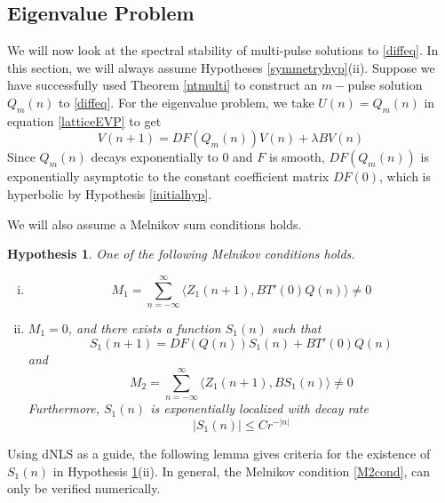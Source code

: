 \documentclass[12pt]{article}
\newtheorem{hypothesis}{Hypothesis}
\begin{document}
\subsection{Eigenvalue Problem}

We will now look at the spectral stability of multi-pulse solutions to \eqref{diffeq}. In this section, we will always assume Hypotheses \ref{symmetryhyp}(ii). Suppose we have successfully used Theorem \ref{ntmulti} to construct an $m-$pulse solution $Q_m(n)$ to \eqref{diffeq}. For the eigenvalue problem, we take $U(n) = Q_m(n)$ in equation \eqref{latticeEVP} to get
\begin{equation}\label{multiEVP}
V(n+1) = DF(Q_m(n)) V(n) + \lambda B V(n)
\end{equation}
Since $Q_m(n)$ decays exponentially to 0 and $F$ is smooth, $DF(Q_m(n))$ is exponentially asymptotic to the constant coefficient matrix $DF(0)$, which is hyperbolic by Hypothesis \ref{initialhyp}. 

We will also assume a Melnikov sum conditions holds.
\begin{hypothesis}\label{melnikovhyp}
One of the following Melnikov conditions holds.
\begin{enumerate}[(i)]
\item
\begin{equation}\label{M1cond}
M_1 = \sum_{n=-\infty}^\infty \langle Z_1(n+1), B T'(0)Q(n) \rangle \neq 0
\end{equation}
\item $M_1 = 0$, and there exists a function $S_1(n)$ such that
\begin{equation}\label{S1def}
S_1(n+1) = DF(Q(n)) S_1(n) + B T'(0)Q(n)
\end{equation}
and 
\begin{equation}\label{M2cond}
M_2 = \sum_{n=-\infty}^\infty \langle Z_1(n+1), B S_1(n) \rangle \neq 0 
\end{equation}
Furthermore, $S_1(n)$ is exponentially localized with decay rate
\begin{equation}\label{S1decay}
|S_1(n)| \leq C r^{-|n|}
\end{equation}
\end{enumerate}
\end{hypothesis}

Using dNLS as a guide, the following lemma gives criteria for the existence of $S_1(n)$ in Hypothesis \ref{melnikovhyp}(ii). In general, the Melnikov condition \eqref{M2cond}, can only be verified numerically.
\end{document}
